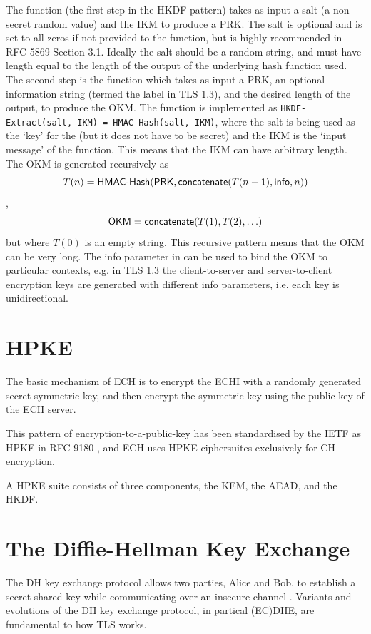 The  function (the first step in the HKDF pattern) takes as input a salt (a non-secret random value) and the \ac{IKM} to produce a \ac{PRK}.
The salt is optional and is set to all zeros if not provided to the function, but is highly recommended in RFC 5869 Section 3.1.
Ideally the salt should be a random string,
and must have length equal to the length of the output of the underlying hash function used.
The second step is the  function
which takes as input a \ac{PRK},
an optional information string (termed the label in \ac{TLS} 1.3),
and the desired length of the output,
to produce the \ac{OKM}.
The  function is implemented as
\verb|HKDF-Extract(salt, IKM) = HMAC-Hash(salt, IKM)|, where the salt is being used as the `key' for the  (but it does not have to be secret)
and the \ac{IKM} is the `input message' of the  function.
This means that the \ac{IKM} can have arbitrary length. The \ac{OKM} is generated recursively as \[T(n) = \text{\textsf{HMAC-Hash}}(\text{\textsf{PRK}}, \text{\textsf{concatenate}}(T(n-1), \text{\textsf{info}}, n))\], \[\text{\textsf{OKM}}=\text{\textsf{concatenate}}(T(1),T(2),\ldots)\]
but where $T(0)$ is an empty string.
This recursive pattern means that the \ac{OKM} can be very long.
The info parameter in  can be used to bind the \ac{OKM} to particular contexts, e.g. in \ac{TLS} 1.3 the client-to-server and server-to-client encryption keys are generated with different info parameters, i.e. each key is unidirectional. 

\section{HPKE}
The basic mechanism of \ac{ECH} is to encrypt the \ac{ECHI} with a randomly generated secret symmetric key, and then encrypt the symmetric key using the public key of the ECH server.

This pattern of encryption-to-a-public-key has been standardised by the \ac{IETF} as \ac{HPKE} in RFC 9180 \citep{rfc9180hpke},
and \ac{ECH} uses \ac{HPKE} ciphersuites exclusively
for \ac{CH} encryption.

A \ac{HPKE} suite consists of three components, the \ac{KEM}, the \ac{AEAD}, and the \ac{HKDF}.

\section{ The Diffie-Hellman Key Exchange }
The \ac{DH} key exchange protocol allows two parties, Alice and Bob, to establish a secret shared key
while communicating over an insecure channel \cite{diffie-hellman-1976}.
Variants and evolutions of the \ac{DH} key exchange protocol, in partical (\ac{EC})\ac{DHE},
are fundamental to how \ac{TLS} works.

